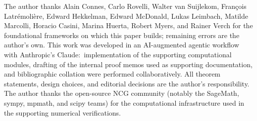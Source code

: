 \documentclass[11pt,a4paper]{article}
\theoremstyle{plain}
\theoremstyle{definition}
\begin{document}
The author thanks Alain Connes, Carlo Rovelli, Walter van Suijlekom,
Fran\c{c}ois Latr\'emoli\`ere, Edward Hekkelman, Edward McDonald,
Lukas Leimbach, Matilde Marcolli, Horacio Casini, Marina Huerta,
Robert Myers, and Rainer Verch for the foundational frameworks
on which this paper builds; remaining errors are the author's own.
This work was developed in an AI-augmented agentic workflow with
Anthropic's Claude:\ implementation of the supporting computational
modules, drafting of the internal proof memos used as supporting
documentation, and bibliographic collation were performed
collaboratively. All theorem statements, design choices, and
editorial decisions are the author's responsibility. The author
thanks the open-source NCG community (notably the SageMath, sympy,
mpmath, and scipy teams) for the computational infrastructure used in
the supporting numerical verifications.
\end{document}
